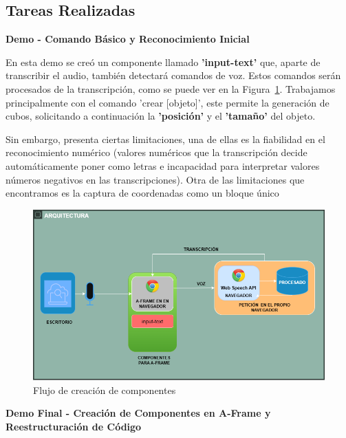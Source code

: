 \documentclass[a4paper, 12pt]{book}
\begin{document}
\subsection{Tareas Realizadas}

\textbf{Demo - Comando Básico y Reconocimiento Inicial} 

En esta demo se creó un componente llamado \textbf{'input-text'} que, aparte de transcribir el audio, también detectará comandos de voz. 
Estos comandos serán procesados de la transcripción, como se puede ver en la Figura~\ref{fig:componente1}.
Trabajamos principalmente con el comando 'crear [objeto]', este permite la generación de cubos, solicitando a continuación la \textbf{'posición'} y el \textbf{'tamaño'} del objeto. 

Sin embargo, presenta ciertas limitaciones, una de ellas es la fiabilidad en el reconocimiento numérico (valores numéricos que la transcripción decide automáticamente poner como letras e incapacidad para interpretar valores números negativos en las transcripciones).
Otra de las limitaciones que encontramos es la captura de coordenadas como un bloque único
  \begin{figure}[H]  %
    \centering
    \includegraphics[width=0.7\linewidth]{img/componentes1.png}  %
    \caption{Flujo de creación de componentes}  %
    \label{fig:componente1}  %
  \end{figure} 

\textbf{Demo Final - Creación de Componentes en A-Frame y Reestructuración de Código}
\end{document}
